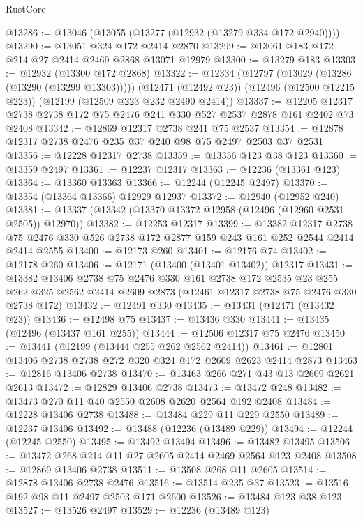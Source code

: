 \begin{lexlean}{RustCore}
\begin{coremodule}
@13286 := @13046 (@13055 (@13277 (@12932 (@13279 @334 @172 @2940))))
@13290 := @13051 @324 @172 @2414 @2870
@13299 := @13061 @183 @172 @214 @27 @2414 @2469 @2868 @13071 @12979
@13300 := @13279 @183
@13303 := @12932 (@13300 @172 @2868)
@13322 := @12334
    (@12797 (@13029 (@13286 (@13290 (@13299 @13303)))))
    (@12471 (@12492 @23))
    (@12496 (@12500 @12215 @223))
    (@12199 (@12509 @223 @232 @2490 @2414))
@13337 := @12205 @12317 @2738 @2738 @172 @75 @2476 @241 @330 @527 @2537 @2878 @161 @2402 @73 @2408
@13342 := @12869 @12317 @2738 @241 @75 @2537
@13354 := @12878 @12317 @2738 @2476 @235 @37 @240 @98 @75 @2497 @2503 @37 @2531
@13356 := @12228 @12317 @2738
@13359 := @13356 @123 @38 @123
@13360 := @13359 @2497
@13361 := @12237 @12317
@13363 := @12236 (@13361 @123)
@13364 := @13360 @13363
@13366 := @12244 (@12245 @2497)
@13370 := @13354 (@13364 @13366) @12929 @12937
@13372 := @12940 (@12952 @240)
@13381 := @13337 (@13342 (@13370 @13372 @12958 (@12496 (@12960 @2531 @2505)) @12970))
@13382 := @12253 @12317
@13399 := @13382
    @12317
    @2738
    @75
    @2476
    @330
    @526
    @2738
    @172
    @2877
    @159
    @243
    @161
    @252
    @2544
    @2414
    @2414
    @2555
@13400 := @12173 @260
@13401 := @12176 @74
@13402 := @12178 @260
@13406 := @12171 (@13400 (@13401 @13402)) @12317
@13431 := @13382
    @13406
    @2738
    @75
    @2476
    @330
    @161
    @2738
    @172
    @2535
    @23
    @255
    @262
    @325
    @2562
    @2414
    @2609
    @2873
    (@12461 @12317 @2738 @75 @2476 @330 @2738 @172)
@13432 := @12491 @330
@13435 := @13431 (@12471 (@13432 @23))
@13436 := @12498 @75
@13437 := @13436 @330
@13441 := @13435 (@12496 (@13437 @161 @255))
@13444 := @12506 @12317 @75 @2476
@13450 := @13441 (@12199 (@13444 @255 @262 @2562 @2414))
@13461 := @12801 @13406 @2738 @2738 @272 @320 @324 @172 @2609 @2623 @2414 @2873
@13463 := @12816 @13406 @2738
@13470 := @13463 @266 @271 @43 @13 @2609 @2621 @2613
@13472 := @12829 @13406 @2738
@13473 := @13472 @248
@13482 := @13473 @270 @11 @40 @2550 @2608 @2620 @2564 @192 @2408
@13484 := @12228 @13406 @2738
@13488 := @13484 @229 @11 @229 @2550
@13489 := @12237 @13406
@13492 := @13488 (@12236 (@13489 @229))
@13494 := @12244 (@12245 @2550)
@13495 := @13492 @13494
@13496 := @13482 @13495
@13506 := @13472 @268 @214 @11 @27 @2605 @2414 @2469 @2564 @123 @2408
@13508 := @12869 @13406 @2738
@13511 := @13508 @268 @11 @2605
@13514 := @12878 @13406 @2738 @2476
@13516 := @13514 @235 @37
@13523 := @13516 @192 @98 @11 @2497 @2503 @171 @2600
@13526 := @13484 @123 @38 @123
@13527 := @13526 @2497
@13529 := @12236 (@13489 @123)

\end{coremodule}
\end{lexlean}
